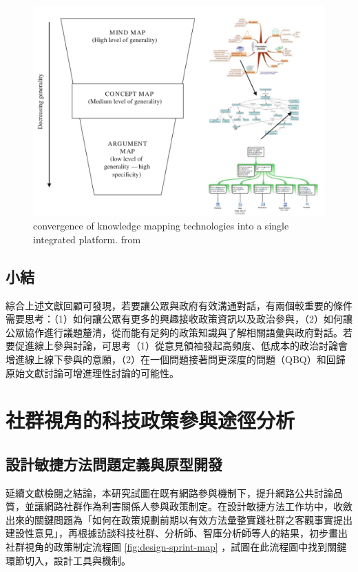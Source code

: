 \documentclass[12pt,a4paper]{article}
\begin{document}
\begin{figure}[htbp]
\centering
\includegraphics[width=.9\linewidth]{./images/kmap.png}
\caption{\label{fig:org61d278b}
convergence of knowledge mapping technologies into a single integrated platform. from \citep*{davies10}}
\end{figure}
\subsection{小結}
\label{sec:orgde6b83d}
綜合上述文獻回顧可發現，若要讓公眾與政府有效溝通對話，有兩個較重要的條件需要思考：（1）如何讓公眾有更多的興趣接收政策資訊以及政治參與，（2）如何讓公眾協作進行議題釐清，從而能有足夠的政策知識與了解相關語彙與政府對話。若要促進線上參與討論，可思考（1）從意見領袖發起高頻度、低成本的政治討論會增進線上線下參與的意願，（2）在一個問題接著問更深度的問題（QBQ）和回歸原始文獻討論可增進理性討論的可能性。
\section{社群視角的科技政策參與途徑分析 }
\label{sec:orgcd355a4}
\subsection{設計敏捷方法問題定義與原型開發}
\label{sec:orgc4aa4ce}
延續文獻檢閱之結論，本研究試圖在既有網路參與機制下，提升網路公共討論品質，並讓網路社群作為利害關係人參與政策制定。在設計敏捷方法工作坊中，收斂出來的關鍵問題為「如何在政策規劃前期以有效方法彙整實踐社群之客觀事實提出建設性意見」，再根據訪談科技社群、分析師、智庫分析師等人的結果，初步畫出社群視角的政策制定流程圖 \ref{fig:design-sprint-map} ，試圖在此流程圖中找到關鍵環節切入，設計工具與機制。
\end{document}
